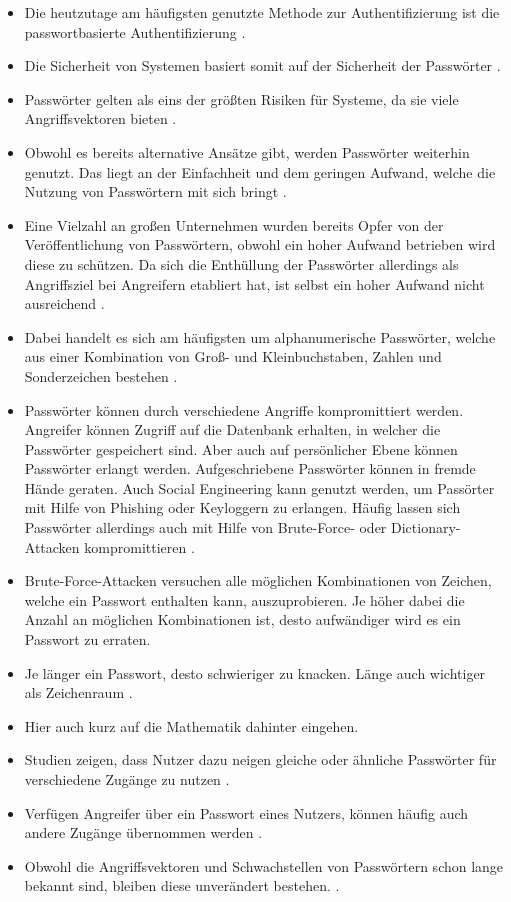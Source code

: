 \begin{itemize}
    \item Die heutzutage am häufigsten genutzte Methode zur Authentifizierung ist die passwortbasierte Authentifizierung \cite{chanda2016password} \cite{boonkrong2012security} \cite{yildirim2019encouraging}.
    \item Die Sicherheit von Systemen basiert somit auf der Sicherheit der Passwörter \cite{boonkrong2012security}.
    \item Passwörter gelten als eins der größten Risiken für Systeme, da sie viele Angriffsvektoren bieten \cite{yildirim2019encouraging}.
    \item Obwohl es bereits alternative Ansätze gibt, werden Passwörter weiterhin genutzt. Das liegt an der Einfachheit und dem geringen Aufwand, welche die Nutzung von Passwörtern mit sich bringt \cite{yildirim2019encouraging}.
    \item Eine Vielzahl an großen Unternehmen wurden bereits Opfer von der Veröffentlichung von Passwörtern, obwohl ein hoher Aufwand betrieben wird diese zu schützen. Da sich die Enthüllung der Passwörter allerdings als Angriffsziel bei Angreifern etabliert hat, ist selbst ein hoher Aufwand nicht ausreichend \cite{boonkrong2012security}.
    \item Dabei handelt es sich am häufigsten um alphanumerische Passwörter, welche aus einer Kombination von Groß- und Kleinbuchstaben, Zahlen und Sonderzeichen bestehen \cite{chanda2016password}. 
    \item Passwörter können durch verschiedene Angriffe kompromittiert werden. Angreifer können Zugriff auf die Datenbank erhalten, in welcher die Passwörter gespeichert sind. Aber auch auf persönlicher Ebene können Passwörter erlangt werden. Aufgeschriebene Passwörter können in fremde Hände geraten. Auch Social Engineering kann genutzt werden, um Passörter mit Hilfe von Phishing oder Keyloggern zu erlangen. Häufig lassen sich Passwörter allerdings auch mit Hilfe von Brute-Force- oder Dictionary-Attacken kompromittieren \cite{chanda2016password}.
    \item Brute-Force-Attacken versuchen alle möglichen Kombinationen von Zeichen, welche ein Passwort enthalten kann, auszuprobieren. Je höher dabei die Anzahl an möglichen Kombinationen ist, desto aufwändiger wird es ein Passwort zu erraten.
    \item Je länger ein Passwort, desto schwieriger zu knacken. Länge auch wichtiger als Zeichenraum \cite{chanda2016password}.
    \item Hier auch kurz auf die Mathematik dahinter eingehen.
    \item Studien zeigen, dass Nutzer dazu neigen gleiche oder ähnliche Passwörter für verschiedene Zugänge zu nutzen \cite{chanda2016password} \cites{ives2004domino}.
    \item Verfügen Angreifer über ein Passwort eines Nutzers, können häufig auch andere Zugänge übernommen werden \cite{chanda2016password}.
    \item Obwohl die Angriffsvektoren und Schwachstellen von Passwörtern schon lange bekannt sind, bleiben diese unverändert bestehen. \cite{ives2004domino}.
\end{itemize}

